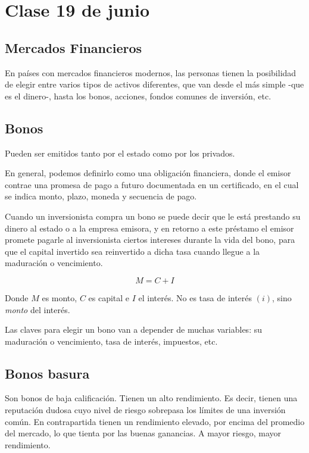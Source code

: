 \section{Clase 19 de junio}

\subsection{Mercados Financieros}

En países con mercados financieros modernos,
las personas tienen la posibilidad de elegir
entre varios tipos de activos diferentes,
que van desde el más simple -que es el dinero-,
hasta los bonos, acciones, fondos comunes de inversión, etc.

\subsection{Bonos}

Pueden ser emitidos tanto por el estado como por los privados.

En general,
podemos definirlo como una obligación financiera,
donde el emisor contrae una promesa de pago a futuro
documentada en un certificado,
en el cual se indica monto, plazo, moneda y secuencia de pago.

Cuando un inversionista compra un bono se puede decir que le está prestando su
dinero al estado o a la empresa emisora,
y en retorno a este préstamo el emisor promete pagarle al inversionista ciertos
intereses durante la vida del bono,
para que el capital invertido sea reinvertido a dicha tasa cuando llegue a la
maduración o vencimiento.

\begin{equation*}
    M = C + I
\end{equation*}

Donde $M$ es monto,
$C$ es capital
e $I$ el interés.
No es tasa de interés $(i)$,
sino \textit{monto} del interés.

Las claves para elegir un bono van a depender de muchas variables:
su maduración o vencimiento, tasa de interés, impuestos, etc.

\subsection{Bonos basura}

Son bonos de baja calificación.
Tienen un alto rendimiento.
Es decir, tienen una reputación dudosa
cuyo nivel de riesgo sobrepasa los límites de una inversión común.
En contrapartida tienen un rendimiento elevado,
por encima del promedio del mercado,
lo que tienta por las buenas ganancias.
A mayor riesgo,
mayor rendimiento.

